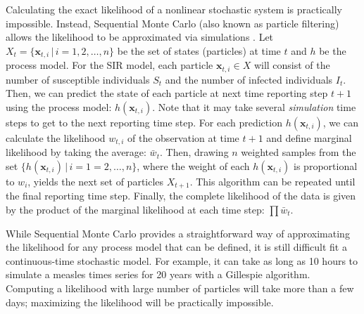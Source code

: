 \documentclass{article}
\begin{document}
Calculating the exact likelihood of a nonlinear stochastic system is practically impossible.
Instead, Sequential Monte Carlo (also known as particle filtering) allows the likelihood to be approximated via simulations \citep{doucet2001introduction, arulampalam2002tutorial}.
Let $X_t = \{\mathbf{x}_{t, i} \,|\, i= 1, 2, \dots, n\}$ be the set of states (particles) at time $t$ and $h$ be the process model.
For the SIR model, each particle $\mathbf{x}_{t, i} \in X$ will consist of the number of susceptible individuals $S_t$ and the number of infected individuals $I_t$.
Then, we can predict the state of each particle at next time reporting step $t+1$ using the process model: $h(\mathbf{x}_{t, i})$.
Note that it may take several \emph{simulation} time steps to get to the next reporting time step.
For each prediction $h(\mathbf{x}_{t, i})$, we can calculate the likelihood $w_{t,i}$ of the observation at time $t+1$ and define marginal likelihood by taking the average: $\bar{w}_t$.
Then, drawing $n$ weighted samples from the set $\{h(\mathbf{x}_{t, i}) \,|\, i = 1=2, \dots, n\}$, where the weight of each $h(\mathbf{x}_{t, i})$ is proportional to $w_i$, yields the next set of particles $X_{t+1}$.
This algorithm can be repeated until the final reporting time step.
Finally, the complete likelihood of the data is given by the product of the marginal likelihood at each time step: $\prod \bar{w}_{t}$.

While Sequential Monte Carlo provides a straightforward way of approximating the likelihood for any process model that can be defined, it is still difficult fit a continuous-time stochastic model. 
For example, it can take as long as 10 hours to simulate a measles times series for 20 years with a Gillespie algorithm.
Computing a likelihood with large number of particles will take more than a few days; 
maximizing the likelihood will be practically impossible.
\end{document}

